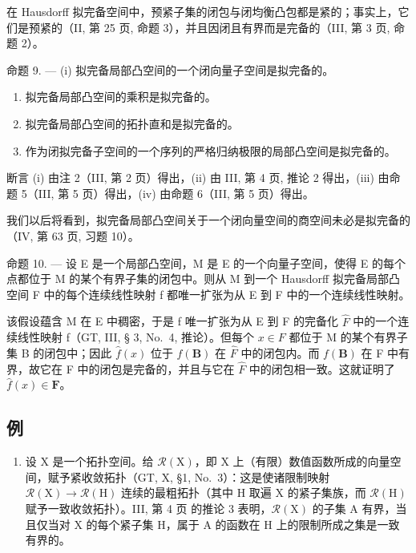 在 Hausdorff 拟完备空间中，预紧子集的闭包与闭均衡凸包都是紧的；事实上，它们是预紧的（II, 第 25 页, 命题 3），并且因闭且有界而是完备的（III, 第 3 页, 命题 2）。

命题 9. --- (i) 拟完备局部凸空间的一个闭向量子空间是拟完备的。

\begin{enumerate}
\def\labelenumi{(\roman{enumi})}
\setcounter{enumi}{1}
\item
  拟完备局部凸空间的乘积是拟完备的。
\item
  拟完备局部凸空间的拓扑直和是拟完备的。
\item
  作为闭拟完备子空间的一个序列的严格归纳极限的局部凸空间是拟完备的。
\end{enumerate}

断言 (i) 由注 2（III, 第 2 页）得出，(ii) 由 III, 第 4 页, 推论 2 得出，(iii) 由命题 5（III, 第 5 页）得出，(iv) 由命题 6（III, 第 5 页）得出。

我们以后将看到，拟完备局部凸空间关于一个闭向量空间的商空间未必是拟完备的（IV, 第 63 页, 习题 10）。

命题 10. --- 设 E 是一个局部凸空间，M 是 E 的一个向量子空间，使得 E 的每个点都位于 M 的某个有界子集的闭包中。则从 M 到一个 Hausdorff 拟完备局部凸空间 F 中的每个连续线性映射 f 都唯一扩张为从 E 到 F 中的一个连续线性映射。

该假设蕴含 M 在 E 中稠密，于是 f 唯一扩张为从 E 到 F 的完备化 \(\hat{F}\) 中的一个连续线性映射 f（GT, III, § 3, No.~4, 推论）。但每个 \(x \in F\) 都位于 M 的某个有界子集 B 的闭包中；因此 \(\hat{f}(x)\) 位于 \(f(\mathbf{B})\) 在 \(\hat{F}\) 中的闭包内。而 \(f(\mathbf{B})\) 在 F 中有界，故它在 F 中的闭包是完备的，并且与它在 \(\hat{F}\) 中的闭包相一致。这就证明了 \(\hat{f}(x) \in \mathbf{F}\)。

\subsection{例}

\begin{enumerate}
\def\labelenumi{\alph{enumi})}
\tightlist
\item
  设 X 是一个拓扑空间。给 \(\mathcal{R}(\mathrm{X})\)，即 X 上（有限）数值函数所成的向量空间，赋予紧收敛拓扑（GT, X, §1, No.~3）：这是使诸限制映射 \(\mathcal{R}(\mathrm{X}) \to \mathcal{R}(\mathrm{H})\) 连续的最粗拓扑（其中 H 取遍 X 的紧子集族，而 \(\mathcal{R}(\mathrm{H})\) 赋予一致收敛拓扑）。III, 第 4 页 的推论 3 表明，\(\mathcal{R}(\mathrm{X})\) 的子集 A 有界，当且仅当对 X 的每个紧子集 H，属于 A 的函数在 H 上的限制所成之集是一致有界的。
\end{enumerate}

